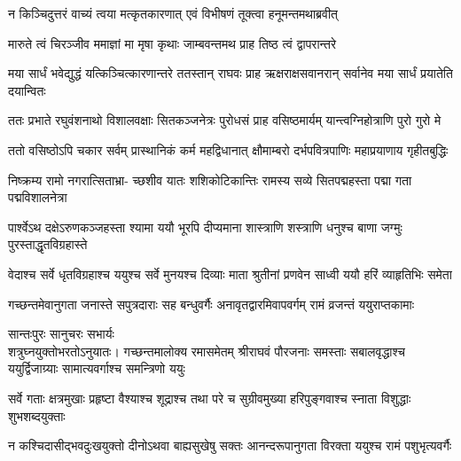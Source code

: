 \twolineshloka
{न किञ्चिदुत्तरं वाच्यं त्वया मत्कृतकारणात्}
{एवं विभीषणं तूक्त्वा हनूमन्तमथाब्रवीत्} %

\twolineshloka
{मारुते त्वं चिरञ्जीव ममाज्ञां मा मृषा कृथाः}
{जाम्बवन्तमथ प्राह तिष्ठ त्वं द्वापरान्तरे} %

\threelineshloka
{मया सार्धं भवेद्युद्धं यत्किञ्चित्कारणान्तरे}
{ततस्तान् राघवः प्राह ऋक्षराक्षसवानरान्}
{सर्वानेव मया सार्धं प्रयातेति दयान्वितः} %

\fourlineindentedshloka
{ततः प्रभाते रघुवंशनाथो}
{विशालवक्षाः सितकञ्जनेत्रः}
{पुरोधसं प्राह वसिष्ठमार्यम्}
{यान्त्वग्निहोत्राणि पुरो गुरो मे} %

\fourlineindentedshloka
{ततो वसिष्ठोऽपि चकार सर्वम्}
{प्रास्थानिकं कर्म महद्विधानात्}
{क्षौमाम्बरो दर्भपवित्रपाणिः}
{महाप्रयाणाय गृहीतबुद्धिः} %

\fourlineindentedshloka
{निष्क्रम्य रामो नगरात्सिताभ्रा-}
{च्छशीव यातः शशिकोटिकान्तिः}
{रामस्य सव्ये सितपद्महस्ता}
{पद्मा गता पद्मविशालनेत्रा} %

\fourlineindentedshloka
{पार्श्वेऽथ दक्षेऽरुणकञ्जहस्ता}
{श्यामा ययौ भूरपि दीप्यमाना}
{शास्त्राणि शस्त्राणि धनुश्च बाणा}
{जग्मुः पुरस्ताद्धृतविग्रहास्ते} %

\fourlineindentedshloka
{वेदाश्च सर्वे धृतविग्रहाश्च}
{ययुश्च सर्वे मुनयश्च दिव्याः}
{माता श्रुतीनां प्रणवेन साध्वी}
{ययौ हरिं व्याहृतिभिः समेता} %

\fourlineindentedshloka
{गच्छन्तमेवानुगता जनास्ते}
{सपुत्रदाराः सह बन्धुवर्गैः}
{अनावृतद्वारमिवापवर्गम्}
{रामं व्रजन्तं ययुराप्तकामाः}%

\begin{minipage}{\linewidth}
\centering
{\hspace{-9ex}सान्तःपुरः\hspace{0.5ex} सानुचरः \hspace{0.5ex}सभार्यः}\\
{\hspace{-1ex}शत्रुघ्नयुक्तो\hspace{3ex}भरतोऽनुयातः।} 
\fourlineindentedshloka
{गच्छन्तमालोक्य रमासमेतम्}
{श्रीराघवं पौरजनाः समस्ताः}
{सबालवृद्धाश्च ययुर्द्विजाग्र्याः}
{सामात्यवर्गाश्च समन्त्रिणो ययुः} %
\end{minipage}

\fourlineindentedshloka
{सर्वे गताः क्षत्रमुखाः प्रहृष्टा}
{वैश्याश्च शूद्राश्च तथा परे च}
{सुग्रीवमुख्या हरिपुङ्गवाश्च}
{स्नाता विशुद्धाः शुभशब्दयुक्ताः} %

\fourlineindentedshloka
{न कश्चिदासीद्भवदुःखयुक्तो}
{दीनोऽथवा बाह्यसुखेषु सक्तः}
{आनन्दरूपानुगता विरक्ता}
{ययुश्च रामं पशुभृत्यवर्गैः} %

